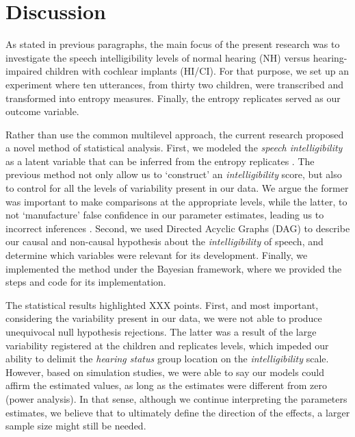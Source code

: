 \section{Discussion} \label{S:discussion}
%
As stated in previous paragraphs, the main focus of the present research was to investigate the speech intelligibility levels of normal hearing (NH) versus hearing-impaired children with cochlear implants (HI/CI). For that purpose, we set up an experiment where ten utterances, from thirty two children, were transcribed and transformed into entropy measures. Finally, the entropy replicates served as our outcome variable.

Rather than use the common multilevel approach, the current research proposed a novel method of statistical analysis. First, we modeled the \textit{speech intelligibility} as a latent variable that can be inferred from the entropy replicates \cite{Everitt_1984, Hoyle_et_al_2014}. The previous method not only allow us to `construct' an \textit{intelligibility} score, but also to control for all the levels of variability present in our data. We argue the former was important to make comparisons at the appropriate levels, while the latter, to not `manufacture' false confidence in our parameter estimates, leading us to incorrect inferences \cite{McElreath_2020}. Second, we used Directed Acyclic Graphs (DAG) \cite{Pearl_2009, Cinelli_et_al_2021} to describe our causal and non-causal hypothesis about the \textit{intelligibility} of speech, and determine which variables were relevant for its development. Finally, we implemented the method under the Bayesian framework, where we provided the steps and code for its implementation.

\begin{comment}
	we believe that pre-aggregating procedures could be more pernicious for a proper statistical inference \citep{McElreath_2020}
\end{comment}
	
The statistical results highlighted XXX points. First, and most important, considering the variability present in our data, we were not able to produce unequivocal null hypothesis rejections. The latter was a result of the large variability registered at the children and replicates levels, which impeded our ability to delimit the \textit{hearing status} group location on the \textit{intelligibility} scale. However, based on simulation studies, we were able to say our models could affirm the estimated values, as long as the estimates were different from zero (power analysis). In that sense, although we continue interpreting the parameters estimates, we believe that to ultimately define the direction of the effects, a larger sample size might still be needed. 

